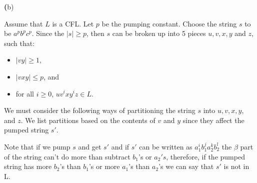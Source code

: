 \documentclass[11pt]{article}
\renewcommand{\part}[1] {{\vspace{0.15in}\noindent\textbf (#1)} \vspace{0.10in}}
\begin{document}
\part{b}

Assume that $L$ is a CFL.  Let $p$ be the pumping constant.  Choose the string $s$ to be $a^pb^pc^p$.  Since the $|s| \geq p$, then $s$ can be broken up into 5 pieces $u,v,x,y$ and $z$, such that:
\begin{itemize}
	\item $|vy| \geq 1$,
	\item $|vxy| \leq p$, and
	\item for all $i \geq 0$, $uv^ixy^iz \in L$.
\end{itemize} 

\noindent 
We must consider the following ways of partitioning the string $s$ into $u,v,x,y$, and $z$. We list partitions based on the contents of $v$ and $y$ since they affect the pumped string $s'$.

Note that if we pump $s$ and get $s'$ and if  $s'$ can be written as $a_1^ib_1^ja_2^kb_2^l$ the $\beta$ part of the string can't do more than subtract $b_1$'s or $a_2's$, therefore, if the pumped string has more $b_2$'s than $b_1$'s or more $a_1$'s than $a_2$'s we can say that $s'$ is not in L.
\end{document}
